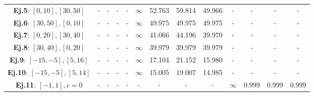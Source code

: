 \begin{table}
\begin{tabular}{|c|cccc|cccc|cccc|}
		\textbf{Ej.5}: $[0,10], [30,50]$           & -                                             & -                                                & -                                   & -              & $\infty$       & 52.763                  & 59.814     & 49.966         & -              & -                       & -          & -              \\
		\textbf{Ej.6}: $[30,50], [0,10]$           & -                                             & -                                                & -                                   & -              & $\infty$       & 49.975                  & 49.975     & 49.975         & -              & -                       & -          & -              \\
		\textbf{Ej.7}: $[0,20], [30,40]$           & -                                             & -                                                & -                                   & -              & $\infty$       & 41.066                  & 44.196     & 39.970         & -              & -                       & -          & -              \\
		\textbf{Ej.8}: $[30,40], [0,20]$           & -                                             & -                                                & -                                   & -              & $\infty$       & 39.979                  & 39.979     & 39.979         & -              & -                       & -          & -              \\
		\textbf{Ej.9}: $[-15,-5], [5,16]$          & -                                             & -                                                & -                                   & -              & $\infty$       & 17.104                  & 21.152     & 15.980         & -              & -                       & -          & -              \\
		\textbf{Ej.10}: $[-15,-5], [5,14]$         & -                                             & -                                                & -                                   & -              & $\infty$       & 15.005                  & 19.007     & 14.985         & -              & -                       & -          & -              \\
		\textbf{Ej.11}: $[-1,1], c=0$              & -                                             & -                                                & -                                   & -              & -              & -                       & -          & -              & $\infty$       & 0.999                   & 0.999      & 0.999          \\

\end{tabular}
\end{table}
